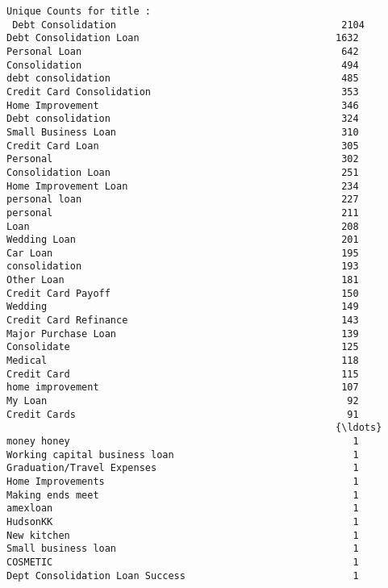 \documentclass[11pt]{article}
\begin{document}
\begin{Verbatim}[commandchars=\\\{\}]
Unique Counts for title :
 Debt Consolidation                                       2104
Debt Consolidation Loan                                  1632
Personal Loan                                             642
Consolidation                                             494
debt consolidation                                        485
Credit Card Consolidation                                 353
Home Improvement                                          346
Debt consolidation                                        324
Small Business Loan                                       310
Credit Card Loan                                          305
Personal                                                  302
Consolidation Loan                                        251
Home Improvement Loan                                     234
personal loan                                             227
personal                                                  211
Loan                                                      208
Wedding Loan                                              201
Car Loan                                                  195
consolidation                                             193
Other Loan                                                181
Credit Card Payoff                                        150
Wedding                                                   149
Credit Card Refinance                                     143
Major Purchase Loan                                       139
Consolidate                                               125
Medical                                                   118
Credit Card                                               115
home improvement                                          107
My Loan                                                    92
Credit Cards                                               91
                                                         {\ldots} 
money honey                                                 1
Working capital business loan                               1
Graduation/Travel Expenses                                  1
Home Improvements                                           1
Making ends meet                                            1
amexloan                                                    1
HudsonKK                                                    1
New kitchen                                                 1
Small business loan                                         1
COSMETIC                                                    1
Dept Consolidation Loan Success                             1

\end{Verbatim}
\end{document}
